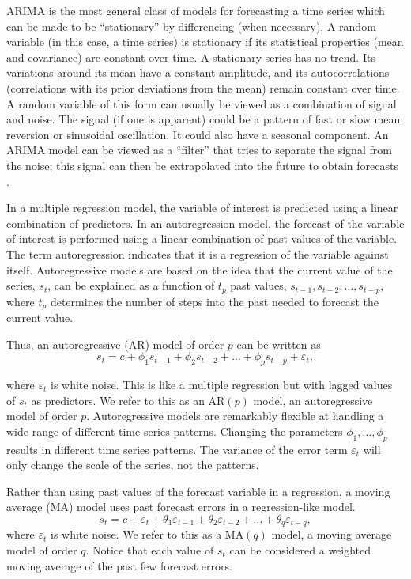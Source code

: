 ARIMA is the most general class of models for forecasting a time series which can be made to be ``stationary'' by differencing (when necessary). A random variable (in this case, a time series) is stationary if its statistical properties (mean and covariance) are constant over time.  A stationary series has no trend. Its variations around its mean have a constant amplitude, and its autocorrelations (correlations with its prior deviations from the mean) remain constant over time.  A random variable of this form can usually be viewed as a combination of signal and noise. The signal (if one is apparent) could be a pattern of fast or slow mean reversion or sinusoidal oscillation. It could also have a seasonal component. An ARIMA model can be viewed as a ``filter'' that tries to separate the signal from the noise; this signal can then be extrapolated into the future to obtain forecasts \cite{Chatfield2019}.

In a multiple regression model, the variable of interest is predicted using a linear combination of predictors. In an autoregression model, the forecast of the variable of interest is performed using a linear combination of past values of the variable. The term autoregression indicates that it is a regression of the variable against itself. Autoregressive models are based on the idea that the current value of the series, $s_{t}$, can be explained as a function of $t_{p}$ past values, $s_{t-1}, s_{t-2}, \ldots, s_{t-p}$, where $t_{p}$ determines the number of steps into the past needed to forecast the current value. 

Thus, an autoregressive (AR) model of order $p$ can be written as 
\begin{equation}
    \label{Eq:AR_p}
    s_{t} = c + \phi_{1} s_{t-1} + \phi_{2} s_{t-2} + \ldots +\phi_{p}s_{t-p} + \varepsilon_{t},
\end{equation} 

where $\varepsilon_{t}$ is white noise. This is like a multiple regression but with lagged values of $s_{t}$ as predictors. We refer to this as an AR$(p)$ model, an autoregressive model of order $p$. Autoregressive models are remarkably flexible at handling a wide range of different time series patterns. Changing the parameters $\phi_{1},\ldots, \phi_{p}$ results in different time series patterns. The variance of the error term $\varepsilon_{t}$ will only change the scale of the series, not the patterns.

Rather than using past values of the forecast variable in a regression, a moving average (MA) model uses past forecast errors in a regression-like model. 
\begin{equation}
    \label{Eq:MA_q}
    s_{t} = c + \varepsilon_{t} + \theta_{1} \varepsilon_{t-1} + \theta_{2}\varepsilon_{t-2} + \ldots + \theta_{q} \varepsilon_{t-q},    
\end{equation}
 where $\varepsilon_{t}$ is white noise. We refer to this as a MA$(q)$ model, a moving average model of order $q$. Notice that each value of $s_{t}$ can be considered a weighted moving average of the past few forecast errors.

